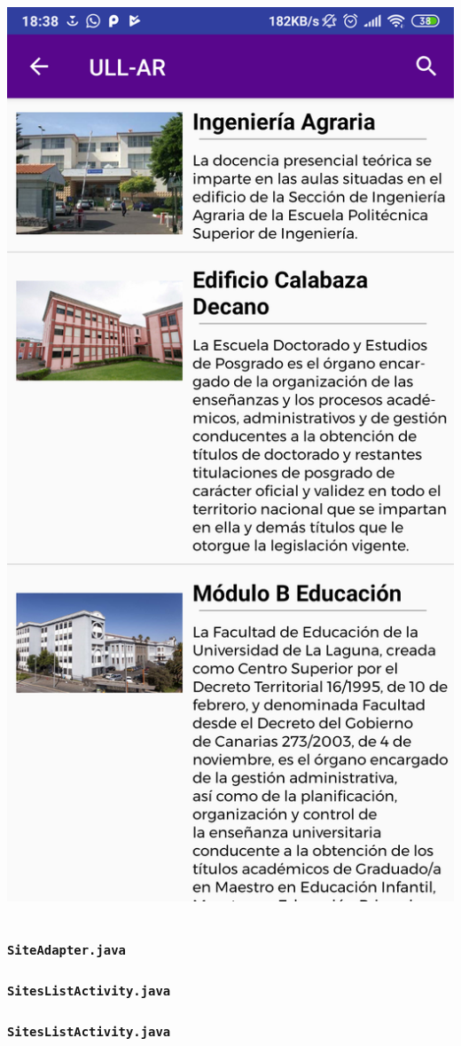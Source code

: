 \begin{frame}
\begin{columns}
\begin{column}{0.4\textwidth}
\begin{center}
				\includegraphics[width=0.75\linewidth]{Images/allSitesApp}
			\end{center}
		\end{column}
	\end{columns}
\end{frame} 
  

\begin{frame}
	\frametitle{\texttt{SiteAdapter.java}}
	
\end{frame} 
 

\begin{frame}
	\frametitle{\texttt{SitesListActivity.java}}
	
\end{frame}  

\begin{frame}
	\frametitle{\texttt{SitesListActivity.java}}
	
\end{frame}  


